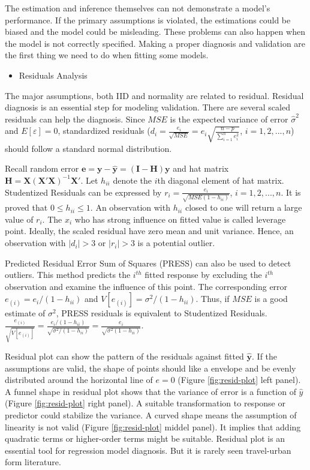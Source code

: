 \documentclass[
  11pt,
  openany]{memoir}
\providecommand{\tightlist}{%
  \setlength{\itemsep}{0pt}\setlength{\parskip}{0pt}}
\begin{document}
The estimation and inference themselves can not demonstrate a model's performance.
If the primary assumptions is violated, the estimations could be biased and the model could be misleading. These problems can also happen when the model is not correctly specified. Making a proper diagnosis and validation are the first thing we need to do when fitting some models.

\begin{itemize}
\tightlist
\item
  Residuals Analysis
\end{itemize}

The major assumptions, both IID and normality are related to residual.
Residual diagnosis is an essential step for modeling validation.
There are several scaled residuals can help the diagnosis.
Since \(MSE\) is the expected variance of error \(\hat\sigma^2\) and \(E[\varepsilon]=0\), standardized residuals (\(d_i=\frac{e_i}{\sqrt{MSE}}=e_i\sqrt{\frac{n-p}{\sum_{i=1}^n e_i^2}}\), \(i=1,2,...,n\)) should follow a standard normal distribution.

Recall random error \(\mathbf{e}=\mathbf{y}-\mathbf{\hat y}=(\mathbf{I}-\mathbf{H})\mathbf{y}\) and hat matrix \(\mathbf{H}=\mathbf{X}(\mathbf{X'X})^{-1}\mathbf{X'}\).
Let \(h_{ii}\) denote the \(i\)th diagonal element of hat matrix.
Studentized Residuals can be expressed by \(r_i=\frac{e_i}{\sqrt{MSE(1-h_{ii})}}\), \(i=1,2,...,n\).
It is proved that \(0\le h_{ii}\le1\).
An observation with \(h_{ii}\) closed to one will return a large value of \(r_i\). The \(x_i\) who has strong influence on fitted value is called leverage point.
Ideally, the scaled residual have zero mean and unit variance. Hence, an observation with \(|d_i|>3\) or \(|r_i|>3\) is a potential outlier.

Predicted Residual Error Sum of Squares (PRESS) can also be used to detect outliers.
This method predicts the \(i^{th}\) fitted response by excluding the \(i^{th}\) observation and examine the influence of this point.
The corresponding error \(e_{(i)}=e_{i}/(1-h_{ii})\) and \(V[e_{(i)}]=\sigma^2/(1-h_{ii})\).
Thus, if \(MSE\) is a good estimate of \(\sigma^2\), PRESS residuals is equivalent to Studentized Residuals.
\(\frac{e_{(i)}}{\sqrt{V[e_{(i)}]}}=\frac{e_i/(1-h_{ii})}{\sqrt{\sigma^2/(1-h_{ii})}}=\frac{e_i}{\sqrt{\sigma^2(1-h_{ii})}}\).

Residual plot can show the pattern of the residuals against fitted \(\mathbf{\hat y}\).
If the assumptions are valid, the shape of points should like a envelope and be evenly distributed around the horizontal line of \(e=0\) (Figure \ref{fig:resid-plot} left panel).
A funnel shape in residual plot shows that the variance of error is a function of \(\hat y\) (Figure \ref{fig:resid-plot} right panel). A suitable transformation to response or predictor could stabilize the variance.
A curved shape means the assumption of linearity is not valid (Figure \ref{fig:resid-plot} middel panel). It implies that adding quadratic terms or higher-order terms might be suitable.
Residual plot is an essential tool for regression model diagnosis. But it is rarely seen travel-urban form literature.
\end{document}
